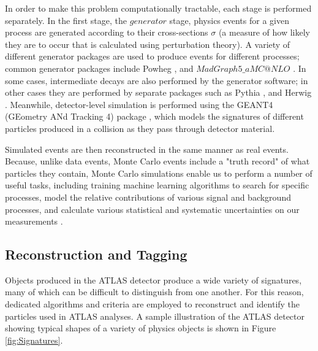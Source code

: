 In order to make this problem computationally tractable, each stage is performed separately. In the first stage, the $generator$ stage, physics events for a given process are generated according to their cross-sections $\sigma$ (a measure of how likely they are to occur that is calculated using perturbation theory). A variety of different generator packages are used to produce events for different processes; common generator packages include Powheg \cite{Powheg}, and $MadGraph5\_aMC@NLO$ \cite{MG5}. In some cases, intermediate decays are also performed by the generator software; in other cases they are performed by separate packages such as Pythia \cite{Pythia8.1} \cite{Pythia8.2}, and Herwig \cite{Herwig}. Meanwhile, detector-level simulation is performed using the GEANT4 (GEometry ANd Tracking 4) package \cite{GEANT4}, which models the signatures of different particles produced in a collision as they pass through detector material.

Simulated events are then reconstructed in the same manner as real events. Because, unlike data events, Monte Carlo events include a "truth record" of what particles they contain, Monte Carlo simulations enable us to perform a number of useful tasks, including training machine learning algorithms to search for specific processes, model the relative contributions of various signal and background processes, and calculate various statistical and systematic uncertainties on our measurements \cite{Aad_2010}.

\subsection{Reconstruction and Tagging} \label{sec:Reco} 

Objects produced in the ATLAS detector produce a wide variety of signatures, many of which can be difficult to distinguish from one another. For this reason, dedicated algorithms and criteria are employed to reconstruct and identify the particles used in ATLAS analyses. A sample illustration of the ATLAS detector showing typical shapes of a variety of physics objects is shown in Figure \ref{fig:Signatures}.

